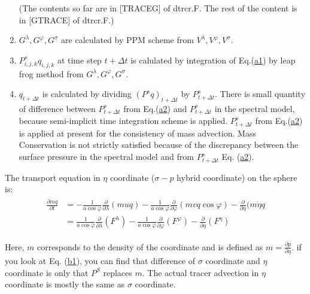 \begin{enumerate}
  (The contents so far are in {[}TRACEG{]} of dtrcr.F. The rest of the content is in {[}GTRACE{]} of dtrcr.F.)
\item
  \(G^{\lambda}, G^{\varphi}, G^{\sigma}\) are calculated by PPM scheme from \(V^{\lambda}, V^{\varphi}, V^{\sigma}\).
\item
  \(P^{s}_{i,j,k}q_{i,j,k}\) at time step \(t+\Delta t\) is calulated by integration of Eq.(\url{a1}) by leap frog method from \(G^{\lambda}, G^{\varphi}, G^{\sigma}\).
\item
  \(q_{t+\Delta t}\) is calculated by dividing \((P^{s}q)_{t+\Delta t}\) by \(P^{s}_{t+\Delta t}\). There is small quantity of difference between \(P^{s}_{t+\Delta t}\) from Eq.(\url{a2}) and
  \(P^{s}_{t+\Delta t}\) in the spectral model, because semi-implicit time integration scheme is applied. \(P^{s}_{t+\Delta t}\) from Eq.(\url{a2}) is applied at present for the consistency of mass
  advection. Mass Conservation is not strictly satisfied because of the discrepancy between the surface pressure in the spectral model and from \(P^{s}_{t+\Delta t}\) Eq. (\url{a2}).
\end{enumerate}

The transport equation in \(\eta\) coordinate (\(\sigma-p\) hybrid coordinate) on the sphere is: \begin{eqnarray}
\begin{aligned}
\frac{\partial mq}{\partial t} &= - \frac{1}{a \cos \varphi} \frac{\partial}{\partial \lambda}(muq)- \frac{1}{a \cos \varphi} \frac{\partial}{\partial \varphi}(mvq \cos \varphi)- \frac{\partial}{\partial \eta} (m \dot{\eta} q \\                                                                         &= \frac{1}{a \cos \varphi} \frac{\partial}{\partial \lambda}(F^{\lambda})- \frac{1}{a \cos \varphi} \frac{\partial}{\partial \varphi}(F^{\varphi})-\frac{\partial}{\partial \eta} (F^{\eta})\end{aligned}\end{eqnarray}

Here, \(m\) corresponds to the density of the coordinate and is defined as \(m=\frac{\partial p}{\partial \eta}\). if you look at Eq. (\url{b1}), you can find that difference of \(\sigma\) coordinate
and \(\eta\) coordinate is only that \(P^{S}\) replaces \(m\). The actual tracer advection in \(\eta\) coordinate is mostly the same as \(\sigma\) coordinate.

